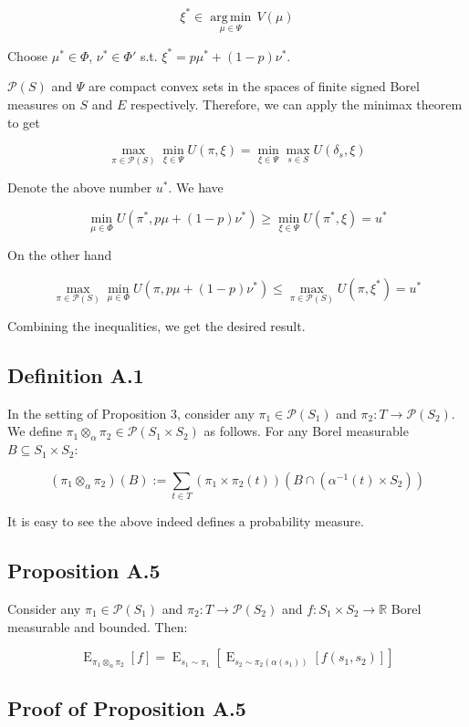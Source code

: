\documentclass[a4paper]{article}
\DeclareMathOperator{\E}{E}
\newcommand{\Argmin}[1]{\underset{#1}{\operatorname{arg\,min}}\,}
\newcommand{\Reals}{\mathbb{R}}
\newcommand{\Prob}{\mathcal{P}}
\begin{document}
$$\xi^* \in \Argmin{\mu \in \Psi} V(\mu)$$

Choose ${\mu^* \in \Phi}$, ${\nu^* \in \Phi'}$ s.t. ${\xi^* = p \mu^* + (1-p) \nu^*}$.

${\Prob(S)}$ and ${\Psi}$ are compact convex sets in the spaces of finite signed Borel measures on ${S}$ and ${E}$ respectively. Therefore, we can apply the minimax theorem to get

$$\max_{\pi \in \Prob(S)} \min_{\xi \in \Psi} U(\pi,\xi) = \min_{\xi \in \Psi} \max_{s \in S} U(\delta_s,\xi)$$

Denote the above number ${u^*}$. We have

$$\min_{\mu \in \Phi} U(\pi^*,p\mu + (1-p)\nu^*) \geq \min_{\xi \in \Psi} U(\pi^*,\xi)=u^*$$

On the other hand

$$\max_{\pi \in \Prob(S)} \min_{\mu \in \Phi} U(\pi,p\mu + (1-p)\nu^*) \leq \max_{\pi \in \Prob(S)}  U(\pi,\xi^*)=u^*$$

Combining the inequalities, we get the desired result.

\subsection{Definition A.1}

In the setting of Proposition 3, consider any ${\pi_1 \in \Prob(S_1)}$ and ${\pi_2: T \rightarrow \Prob(S_2)}$. We define ${\pi_1 \otimes_\alpha \pi_2 \in \Prob(S_1 \times S_2)}$ as follows. For any Borel measurable ${B \subseteq S_1 \times S_2}$:

$$(\pi_1 \otimes_\alpha \pi_2)(B):=\sum_{t \in T} (\pi_1 \times \pi_2(t))(B \cap (\alpha^{-1}(t) \times S_2))$$ 

It is easy to see the above indeed defines a probability measure.

\subsection{Proposition A.5}

Consider any ${\pi_1 \in \Prob(S_1)}$ and ${\pi_2: T \rightarrow \Prob(S_2)}$ and ${f: S_1 \times S_2 \rightarrow \Reals}$ Borel measurable and bounded. Then:

$$\E_{\pi_1 \otimes_\alpha \pi_2}[f] = \E_{s_1 \sim \pi_1}[\E_{s_2 \sim \pi_2(\alpha(s_1))}[f(s_1, s_2)]]$$

\subsection{Proof of Proposition A.5}
\end{document}
